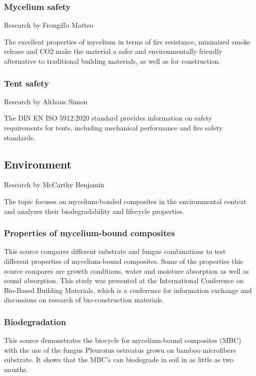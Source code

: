 \documentclass{article}
\begin{document}
\subsubsection{Mycelium safety}
{\small Research by Frongillo Matteo}

The excellent properties of mycelium in terms of fire resistance,
minimized smoke release and CO2 make the material a safer and
environmentally friendly alternative to traditional building
materials, as well as for construction.\\


\subsubsection{Tent safety}
{\small Research by Althaus Simon}

The DIN EN ISO 5912:2020 standard provides information on safety requirements for tents,
including mechanical performance and fire safety standards.\\


\subsection{Environment}
{\small Research by McCarthy Benjamin}

The topic focuses on mycelium-bonded composites in the environmental context and
analyzes their biodegradability and lifecycle properties.

\subsubsection{Properties of mycelium-bound composites}
This source compares different substrate and fungus combinations to test different
properties of mycelium-bound composites. Some of the properties this source compares are
growth conditions, water and moisture absorption as well as sound absorption. This study
was presented at the International Conference on Bio-Based Building Materials, which is a
conference for information exchange and discussions on research of bio-construction
materials.\\


\subsubsection{Biodegradation}
This source demonstrates the biocycle for mycelium-bound composites (MBC) with the use of
the fungus Pleurotus ostreatus grown on bamboo microfibers substrate. It shows that the
MBC’s can biodegrade in soil in as little as two months.\\
\end{document}
